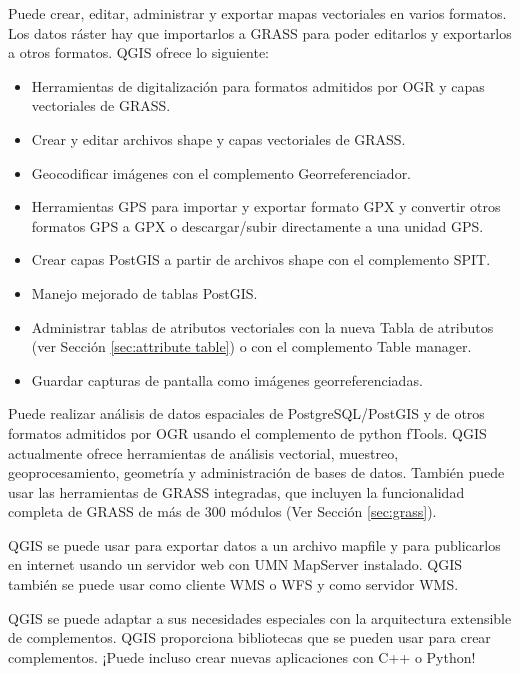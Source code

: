 
Puede crear, editar, administrar y exportar mapas vectoriales en varios formatos. Los datos ráster
hay que importarlos a GRASS para poder editarlos y exportarlos a otros
formatos. QGIS ofrece lo siguiente: 

\begin{itemize}
\item Herramientas de digitalización para formatos admitidos por OGR y capas vectoriales de GRASS.
\item Crear y editar archivos shape y capas vectoriales de GRASS.
\item Geocodificar imágenes con el complemento Georreferenciador.
\item Herramientas GPS para importar y exportar formato GPX y convertir otros formatos GPS
a GPX o descargar/subir directamente a una unidad GPS.
\item Crear capas PostGIS a partir de archivos shape con el complemento SPIT.
\item Manejo mejorado de tablas PostGIS.
\item Administrar tablas de atributos vectoriales con la nueva Tabla de atributos (ver Sección 
\ref{sec:attribute table}) o  con el complemento Table manager.
\item Guardar capturas de pantalla como imágenes georreferenciadas.
\end{itemize}


Puede realizar análisis de datos espaciales de PostgreSQL/PostGIS y de otros formatos
admitidos por OGR usando el complemento de python fTools. QGIS actualmente ofrece
herramientas de análisis vectorial, muestreo, geoprocesamiento, geometría y administración de bases de datos. También puede usar las herramientas de GRASS integradas, que 
incluyen la funcionalidad completa de GRASS de más de 300 módulos (Ver
Sección \ref{sec:grass}).


QGIS se puede usar para exportar datos a un archivo mapfile y para publicarlos en
internet usando un servidor web con UMN MapServer instalado. QGIS también se
puede usar como cliente WMS o WFS y como servidor WMS.


QGIS se puede adaptar a sus necesidades especiales con la arquitectura extensible
de complementos. QGIS proporciona bibliotecas que se pueden usar para crear
complementos. ¡Puede incluso crear nuevas aplicaciones con C++ o Python!

